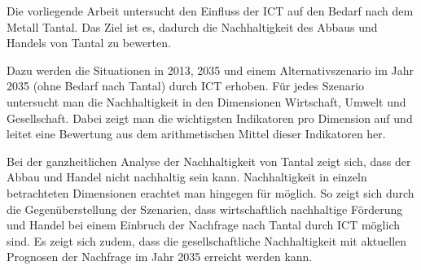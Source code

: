 Die vorliegende Arbeit untersucht den Einfluss der ICT auf den Bedarf nach dem Metall Tantal. Das Ziel ist es, dadurch die Nachhaltigkeit des Abbaus und Handels von Tantal zu bewerten.

Dazu werden die Situationen in 2013, 2035 und einem Alternativszenario im Jahr 2035 (ohne Bedarf nach Tantal) durch ICT erhoben. Für jedes Szenario untersucht man die Nachhaltigkeit in den Dimensionen Wirtschaft, Umwelt und Gesellschaft. Dabei zeigt man die wichtigsten Indikatoren pro Dimension auf und leitet eine Bewertung aus dem arithmetischen Mittel dieser Indikatoren her.

Bei der ganzheitlichen Analyse der Nachhaltigkeit von Tantal zeigt sich, dass der Abbau und Handel nicht nachhaltig sein kann. Nachhaltigkeit in einzeln betrachteten Dimensionen erachtet man hingegen für möglich. So zeigt sich durch die Gegenüberstellung der Szenarien, dass wirtschaftlich nachhaltige Förderung und Handel bei einem Einbruch der Nachfrage nach Tantal durch ICT möglich sind. Es zeigt sich zudem, dass die gesellschaftliche Nachhaltigkeit mit aktuellen Prognosen der Nachfrage im Jahr 2035 erreicht werden kann.
